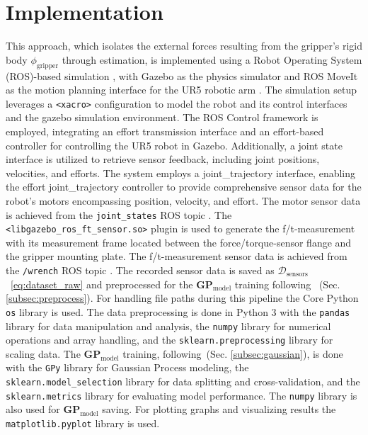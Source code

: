 \chapter{Implementation}
    \label{subsec:practical}
    This approach, which isolates the external forces resulting from the gripper's rigid body \(\phi_{\text{gripper}}\) through estimation, is implemented using a Robot Operating System (ROS)-based simulation \cite{ros_official}, with Gazebo \cite{gazebo_ros} as the physics simulator and ROS MoveIt \cite{moveit} as the motion planning interface for the UR5 robotic arm \cite{ur5_robot}. The simulation setup leverages a \texttt{<xacro>} \cite{xacro_docs} configuration to model the robot and its control interfaces and the gazebo simulation environment. The ROS Control framework \cite{ros_control} is employed, integrating an effort transmission interface and an effort-based controller for controlling the UR5 robot in Gazebo. Additionally, a joint state interface is utilized to retrieve sensor feedback, including joint positions, velocities, and efforts. The system employs a joint\_trajectory interface, enabling the effort joint\_trajectory controller to provide comprehensive sensor data for the robot’s motors encompassing position, velocity, and effort.
    The motor sensor data is achieved from the \texttt{joint\_states} ROS topic \cite{rospy}.
    The \texttt{<libgazebo\_ros\_ft\_sensor.so>} plugin is used to generate the f/t-measurement with its measurement frame located between the force/torque-sensor flange and the gripper mounting plate. The f/t-measurement sensor data is achieved from the \texttt{/wrench} ROS topic \cite{rospy}. The recorded sensor data is saved as \(\mathcal{D}_{\text{sensors}}\)~\eqref{eq:dataset_raw} and preprocessed for the \(\boldsymbol{GP}_{\text{model}}\) training following ~(Sec. \ref{subsec:preprocess}). For handling file paths during this pipeline the Core Python \texttt{os} \cite{python_os} library is used. The data preprocessing is done in Python 3 with the \texttt{pandas} \cite{pandas} library for data manipulation and analysis, the \texttt{numpy} \cite{numpy} library for numerical operations and array handling, and the \texttt{sklearn.preprocessing} \cite{scikit_learn} library for scaling data. The \(\boldsymbol{GP}_{\text{model}}\) training, following~(Sec. \ref{subsec:gaussian}), is done with the \texttt{GPy} \cite{gpy} library for Gaussian Process modeling, the \texttt{sklearn.model\_selection} library for data splitting and cross-validation, and the \texttt{sklearn.metrics} library for evaluating model performance. The \texttt{numpy} library is also used for \(\boldsymbol{GP}_{\text{model}}\) saving. For plotting graphs and visualizing results the \texttt{matplotlib.pyplot} \cite{matplotlib} library is used.
